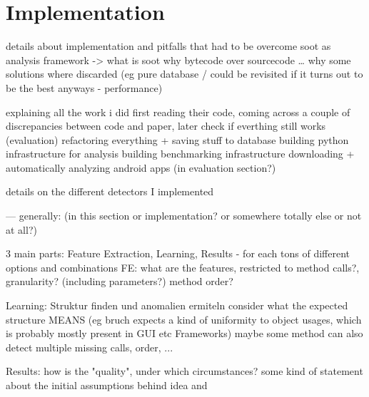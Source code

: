\chapter{Implementation}
details about implementation and pitfalls that had to be overcome
    soot as analysis framework -> what is soot
    why bytecode over sourcecode
    \ldots
why some solutions where discarded (eg pure database / could be revisited if it turns out to be the best anyways - performance)

explaining all the work i did
    first reading their code, coming across a couple of discrepancies between code and paper, later check if everthing still works (evaluation)
    refactoring everything + saving stuff to database
    building python infrastructure for analysis
    building benchmarking infrastructure
    downloading + automatically analyzing android apps (in evaluation section?)
    
details on the different detectors I implemented

--- generally: (in this section or implementation? or somewhere totally else or not at all?)

3 main parts: Feature Extraction, Learning, Results -	for each tons of different options and combinations
FE:
    what are the features, restricted to method calls?, granularity? (including parameters?)
    method order?

Learning:
    Struktur finden und anomalien ermiteln	
    consider what the expected structure MEANS (eg bruch expects a kind of uniformity to object usages, which is probably mostly present in GUI etc Frameworks)
    maybe some method can also detect multiple missing calls, order, ...

Results:
	how is the "quality", under which circumstances?
	some kind of statement about the initial assumptions behind idea and 
